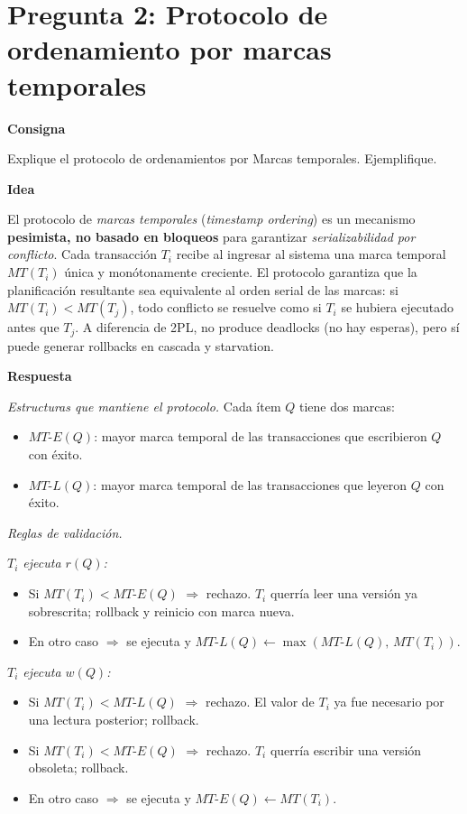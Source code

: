 \documentclass[11pt,a4paper]{article}
\newcommand{\itemcabecera}[1]{\noindent\textbf{#1}\par\medskip}
\newcommand{\bloqueConsigna}{\itemcabecera{Consigna}}
\newcommand{\bloqueIdea}{\itemcabecera{Idea}}
\newcommand{\bloqueRespuesta}{\itemcabecera{Respuesta}}
\begin{document}
\section{Pregunta 2: Protocolo de ordenamiento por marcas temporales}

\bloqueConsigna

Explique el protocolo de ordenamientos por Marcas temporales. Ejemplifique.

\bloqueIdea

El protocolo de \emph{marcas temporales} (\emph{timestamp ordering}) es un mecanismo \textbf{pesimista, no basado en bloqueos} para garantizar \emph{serializabilidad por conflicto}. Cada transacción $T_i$ recibe al ingresar al sistema una marca temporal $MT(T_i)$ única y monótonamente creciente. El protocolo garantiza que la planificación resultante sea equivalente al orden serial de las marcas: si $MT(T_i) < MT(T_j)$, todo conflicto se resuelve como si $T_i$ se hubiera ejecutado antes que $T_j$. A diferencia de 2PL, no produce deadlocks (no hay esperas), pero sí puede generar rollbacks en cascada y starvation.

\bloqueRespuesta

\textit{Estructuras que mantiene el protocolo.} Cada ítem $Q$ tiene dos marcas:

\begin{itemize}
    \item $MT\text{-}E(Q)$: mayor marca temporal de las transacciones que escribieron $Q$ con éxito.
    \item $MT\text{-}L(Q)$: mayor marca temporal de las transacciones que leyeron $Q$ con éxito.
\end{itemize}

\textit{Reglas de validación.}

\textit{$T_i$ ejecuta $r(Q)$:}
\begin{itemize}
    \item Si $MT(T_i) < MT\text{-}E(Q)$ $\Rightarrow$ rechazo. $T_i$ querría leer una versión ya sobrescrita; rollback y reinicio con marca nueva.
    \item En otro caso $\Rightarrow$ se ejecuta y $MT\text{-}L(Q) \gets \max(MT\text{-}L(Q),\,MT(T_i))$.
\end{itemize}

\textit{$T_i$ ejecuta $w(Q)$:}
\begin{itemize}
    \item Si $MT(T_i) < MT\text{-}L(Q)$ $\Rightarrow$ rechazo. El valor de $T_i$ ya fue necesario por una lectura posterior; rollback.
    \item Si $MT(T_i) < MT\text{-}E(Q)$ $\Rightarrow$ rechazo. $T_i$ querría escribir una versión obsoleta; rollback.
    \item En otro caso $\Rightarrow$ se ejecuta y $MT\text{-}E(Q) \gets MT(T_i)$.
\end{itemize}
\end{document}
